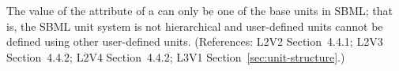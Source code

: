 The value of the  attribute of a \Unit can only be
one of the base units in SBML; that is, the SBML unit
system is not hierarchical and user-defined units cannot be defined using
other user-defined units.  (References: L2V2 Section~4.4.1;
L2V3 Section~4.4.2; L2V4 Section~4.4.2; L3V1 Section~\ref{sec:unit-structure}.)
